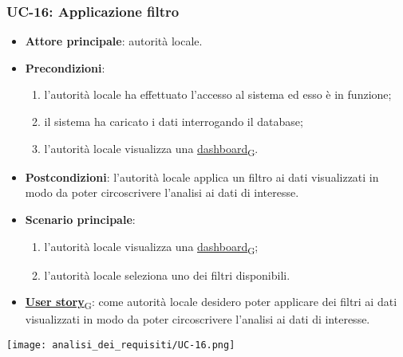 \subsubsection{UC-16: Applicazione filtro}
\begin{itemize}
	\item \textbf{Attore principale}: autorità locale.
	\item \textbf{Precondizioni}:
	      \begin{enumerate}
		      \item l'autorità locale ha effettuato l'accesso al sistema ed esso è in funzione;
		      \item il sistema ha caricato i dati interrogando il database;
		      \item l'autorità locale visualizza una \href{https://7last.github.io/docs/pb/documentazione-interna/glossario\#dashboard}{dashboard\textsubscript{G}}.
	      \end{enumerate}
	\item \textbf{Postcondizioni}: l'autorità locale applica un filtro ai dati visualizzati in modo da poter circoscrivere l'analisi ai dati di interesse.
	\item \textbf{Scenario principale}:
	      \begin{enumerate}
		      \item l'autorità locale visualizza una \href{https://7last.github.io/docs/pb/documentazione-interna/glossario\#dashboard}{dashboard\textsubscript{G}};
		      \item l'autorità locale seleziona uno dei filtri disponibili.
	      \end{enumerate}
	\item \href{https://7last.github.io/docs/pb/documentazione-interna/glossario\#user-story}{\textbf{User story}\textsubscript{G}}:
	      come autorità locale desidero poter applicare dei filtri ai dati visualizzati in modo da poter circoscrivere l'analisi ai dati di interesse.
\end{itemize}
\begin{center}
	\texttt{[image: analisi\_dei\_requisiti/UC-16.png]}
\end{center}

